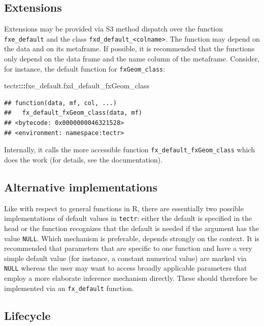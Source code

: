 \documentclass[]{report}
\newenvironment{Shaded}{\begin{snugshade}}{\end{snugshade}}
\newcommand{\OperatorTok}[1]{\textcolor[rgb]{0.81,0.36,0.00}{\textbf{#1}}}
\newcommand{\NormalTok}[1]{#1}
\theoremstyle{definition}
\theoremstyle{definition}
\theoremstyle{definition}
\theoremstyle{remark}
\begin{document}
\subsection{Extensions}\label{extensions}

Extensions may be provided via S3 method dispatch over the function
\texttt{fxe\_default} and the class
\texttt{fxd\_default\_\textless{}colname\textgreater{}}. The function
may depend on the data and on its metaframe. If possible, it is
recommended that the functions only depend on the data frame and the
name column of the metaframe. Consider, for instance, the default
function for \texttt{fxGeom\_class}:

\begin{Shaded}
\begin{Highlighting}[]
\NormalTok{tectr}\OperatorTok{:::}\NormalTok{fxe_default.fxd_default_fxGeom_class}
\end{Highlighting}
\end{Shaded}

\begin{verbatim}
## function(data, mf, col, ...)
##   fx_default_fxGeom_class(data, mf)
## <bytecode: 0x0000000046321528>
## <environment: namespace:tectr>
\end{verbatim}

Internally, it calls the more accessible function
\texttt{fx\_default\_fxGeom\_class} which does the work (for details,
see the documentation).

\subsection{Alternative
implementations}\label{alternative-implementations}

Like with respect to general functions in R, there are essentially two
possible implementations of default values in \texttt{tectr}: either the
default is specified in the head or the function recognizes that the
default is needed if the argument has the value \texttt{NULL}. Which
mechanism is preferable, depends strongly on the context. It is
recommended that parameters that are specific to one function and have a
very simple default value (for instance, a constant numerical value) are
marked via \texttt{NULL} whereas the user may want to access broadly
applicable parameters that employ a more elaborate inference mechanism
directly. These should therefore be implemented via an
\texttt{fx\_default} function.

\subsection{Lifecycle}\label{lifecycle}
\end{document}
